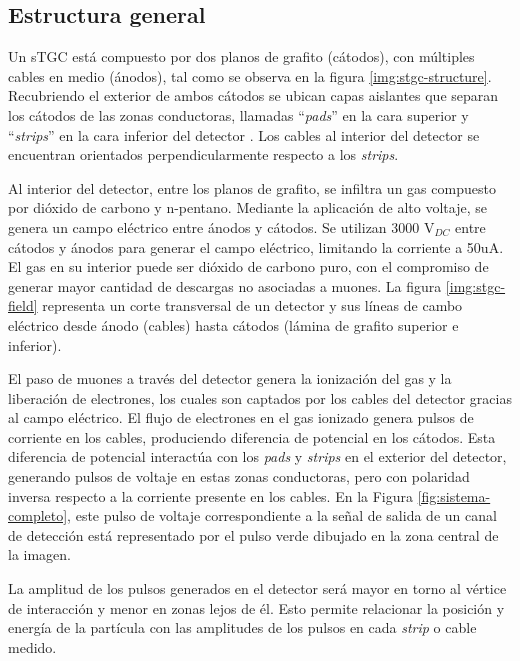 \subsection{Estructura general}  

	Un sTGC está compuesto por dos planos de grafito (cátodos), con múltiples cables en medio (ánodos)\cite{Formenti2018CERNReport}, tal como se observa en la figura \ref{img:stgc-structure}. Recubriendo el exterior de ambos cátodos se ubican capas aislantes que separan los cátodos de las zonas conductoras, llamadas ``\textit{pads}'' en la cara superior y ``\textit{strips}'' en la cara inferior del detector . Los cables al interior del detector se encuentran orientados perpendicularmente respecto a los \textit{strips}.
	
	Al interior del detector, entre los planos de grafito, se infiltra un gas compuesto por dióxido de carbono y n-pentano\cite{Formenti2018CERNReport}. Mediante la aplicación de alto voltaje, se genera un campo eléctrico entre ánodos y cátodos. Se utilizan 3000 V$_{DC}$ entre cátodos y ánodos para generar el campo eléctrico, limitando la corriente a 50uA. El gas en su interior puede ser dióxido de carbono puro, con el compromiso de generar mayor cantidad de descargas no asociadas a muones. La figura \ref{img:stgc-field} representa un corte transversal de un detector y sus líneas de cambo eléctrico desde ánodo (cables) hasta cátodos (lámina de grafito superior e inferior). 
	
	El paso de muones a través del detector genera la ionización del gas y la liberación de electrones, los cuales son captados por los cables del detector gracias al campo eléctrico. El flujo de electrones en el gas ionizado genera pulsos de corriente en los cables, produciendo diferencia de potencial en los cátodos. Esta diferencia de potencial interactúa con los \textit{pads} y \textit{strips} en el exterior del detector, generando pulsos de voltaje en estas zonas conductoras, pero con polaridad inversa respecto a la corriente presente en los cables. En la Figura \ref{fig:sistema-completo}, este pulso de voltaje correspondiente a la señal de salida de un canal de detección está representado por el pulso verde dibujado en la zona central de la imagen.
	
	La amplitud de los pulsos generados en el detector será mayor en torno al vértice de interacción y menor en zonas lejos de él. Esto permite relacionar la posición y energía de la partícula con las amplitudes de los pulsos en cada \textit{strip} o cable medido.
	
